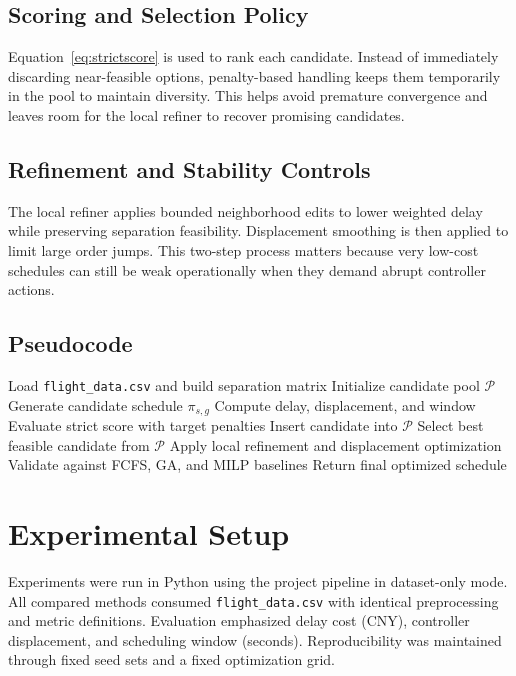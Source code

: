 \documentclass[conference]{IEEEtran}
\begin{document}
\subsection{Scoring and Selection Policy}
Equation~\eqref{eq:strictscore} is used to rank each candidate. Instead of immediately discarding near-feasible options, penalty-based handling keeps them temporarily in the pool to maintain diversity. This helps avoid premature convergence and leaves room for the local refiner to recover promising candidates.

\subsection{Refinement and Stability Controls}
The local refiner applies bounded neighborhood edits to lower weighted delay while preserving separation feasibility. Displacement smoothing is then applied to limit large order jumps. This two-step process matters because very low-cost schedules can still be weak operationally when they demand abrupt controller actions.

\subsection{Pseudocode}
\begin{algorithm}[htbp]
\caption{AERIS-OPT Scheduling Algorithm}
\begin{algorithmic}[1]
\State Load \texttt{flight\_data.csv} and build separation matrix
\State Initialize candidate pool $\mathcal{P}$
        \State Generate candidate schedule $\pi_{s,g}$
        \State Compute delay, displacement, and window
        \State Evaluate strict score with target penalties
        \State Insert candidate into $\mathcal{P}$
    \EndFor
\EndFor
\State Select best feasible candidate from $\mathcal{P}$
\State Apply local refinement and displacement optimization
\State Validate against FCFS, GA, and MILP baselines
\State Return final optimized schedule
\end{algorithmic}
\end{algorithm}

\section{Experimental Setup}
Experiments were run in Python using the project pipeline in dataset-only mode. All compared methods consumed \texttt{flight\_data.csv} with identical preprocessing and metric definitions. Evaluation emphasized delay cost (CNY), controller displacement, and scheduling window (seconds). Reproducibility was maintained through fixed seed sets and a fixed optimization grid.
\end{document}
